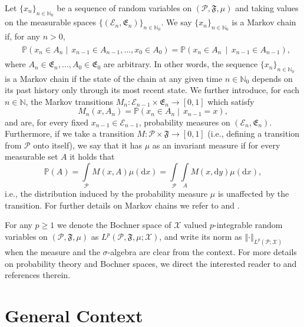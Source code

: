 \documentclass{article}
\newcommand{\cE}{\mathcal{E}}
\newcommand{\cP}{\mathcal{P}}
\newcommand{\cX}{\mathcal{X}}
\newcommand{\fE}{\mathfrak{E}}
\newcommand{\fF}{\mathfrak{F}}
\newcommand{\IN}{\mathbb{N}}
\newcommand{\IP}{\mathbb{P}}
\renewcommand{\d}{{\text{d}}}
\newcommand{\norm}[2]{{\left\Vert #2 \right\Vert}_{#1}}
\newcommand{\lp}[2]{{L}^{#1}( #2 )}
\newcommand{\probspace}{\cP, \fF, \mu}
\newcommand{\probspacesum}{\cP}
\newcommand{\probspacepar}{(\probspace )}
\theoremstyle{definition}
\begin{document}
Let $\{x_n\}_{n\in\IN_0}$ be a sequence of random variables on $\probspacepar$ and taking values
on the measurable spaces $\{(\cE_n, \fE_n)\}_{n\in\IN_0}$. We say $\{x_n\}_{n\in\IN_0}$ is a Markov
chain if, for any $n>0$,
\begin{align*}
  \begin{aligned}
  &\IP\left(x_n\in A_n \middle\vert\,x_{n-1}\in A_{n-1},\hdots, x_0\in A_0\right)=\IP\left(x_n\in A_n\,\middle\vert\,x_{n-1}\in A_{n-1}\right),
    \end{aligned}
\end{align*}
where $A_n\in\fE_n,\hdots,A_0\in\fE_0$ are arbitrary. In other words, the sequence
$\{x_n\}_{n\in\IN_0}$ is a Markov chain if the state of the chain at any given time $n\in\IN_0$
depends on its past history only through its most recent state.
We further introduce, for each $n\in\IN$, the Markov
transitions $M_n:\cE_{n-1}\times\fE_n\to[0,1]$ which satisfy
$$M_n(x, A_n)=\IP\left(x_n\in A_n\middle\vert\,x_{n-1}=x\right),$$
and are, for every fixed $x_{n-1}\in\cE_{n-1}$, probability measures on $(\cE_{n}, \fE_{n})$.
Furthermore, if we take a transition $M:\cP\times\fF\to[0, 1]$ (i.e., defining a transition from $\cP$ onto itself),
we say that it has $\mu$ as an invariant measure if for every measurable set $A$ it holds that
$$\IP(A)=\int\limits_{\cP}M(x, A)\mu(\d x)=\int\limits_{\cP}\int\limits_{A}M(x, \d y)\mu(\d x),$$
i.e., the distribution induced by the probability measure $\mu$ is unaffected by the transition. For further details
on Markov chains we refer to \cite[Sec.~2.2]{DelMoralFeynmanKac2004} and \cite[Chap.~2]{hernandez-lermaMarkovChainsInvariant2003}.

For any $p\geq 1$ we denote the Bochner space of $\cX$ valued $p$-integrable random variables on
$\probspacepar$ as $\lp{p}{\probspace; \cX}$, and write its norm as $\norm{\lp{p}{\probspacesum; \cX}}{\cdot}$
when the measure and the $\sigma$-algebra are clear from the context. For more details on probability theory and Bochner spaces, we direct the interested reader to
\cite{dapratoStochasticEquationsInfinite2014,hytonenAnalysisBanachSpaces2016} and references therein.

\section{General Context}
\label{sec:cont}
\end{document}
